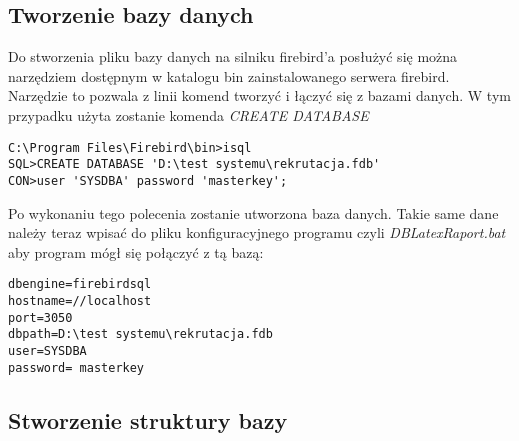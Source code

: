 \subsection{ Tworzenie bazy danych }

Do stworzenia pliku bazy danych na silniku firebird’a posłużyć się można narzędziem dostępnym w katalogu bin zainstalowanego serwera firebird.  Narzędzie to pozwala z linii komend tworzyć i łączyć się z bazami danych. W tym przypadku użyta zostanie komenda \emph{CREATE DATABASE}
\begin{lstlisting}
C:\Program Files\Firebird\bin>isql
SQL>CREATE DATABASE 'D:\test systemu\rekrutacja.fdb'
CON>user 'SYSDBA' password 'masterkey';
\end{lstlisting}
Po wykonaniu tego polecenia zostanie utworzona baza danych. Takie same dane należy teraz wpisać do pliku konfiguracyjnego programu czyli \emph{DBLatexRaport.bat} aby program mógł się połączyć z tą bazą:
\begin{lstlisting}
dbengine=firebirdsql
hostname=//localhost
port=3050
dbpath=D:\test systemu\rekrutacja.fdb
user=SYSDBA
password= masterkey
\end{lstlisting}
\subsection{ Stworzenie struktury bazy}

